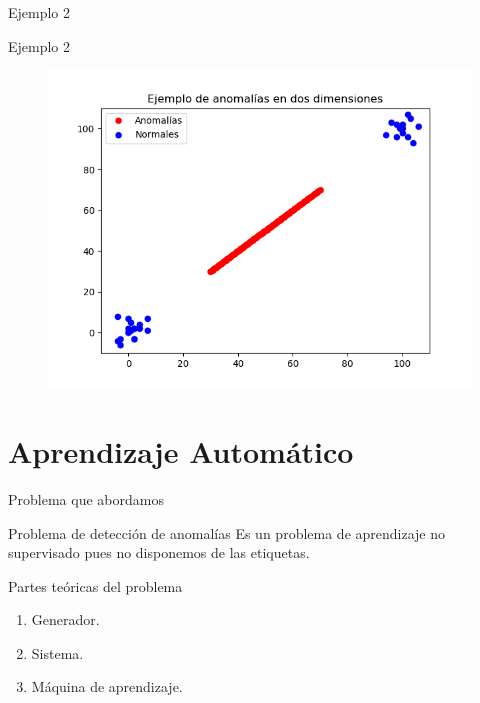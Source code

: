\documentclass[10pt]{beamer}
\begin{document}
\begin{frame}[fragile]{Ejemplo 2}
\vspace{10px}
\centering
{}

\end{frame}

\begin{frame}[fragile]{Ejemplo 2}
\vspace{10px}

\begin{figure}
\centering
\includegraphics[scale=0.6]{Imagenes/outlier-2d-case2.png}
\end{figure}

\end{frame}

\section{Aprendizaje Automático}

\begin{frame}[fragile]{Problema que abordamos}
\vspace{10px}
\pause
{}

\begin{alertblock}{Problema de detección de anomalías}
	Es un problema de aprendizaje no supervisado pues no disponemos de las etiquetas.
\end{alertblock}

\pause

\begin{block}{Partes teóricas del problema}
	\begin{enumerate}
		\item Generador.
		\item Sistema.
		\item Máquina de aprendizaje.
	\end{enumerate}
\end{block}

\end{frame}
\end{document}
